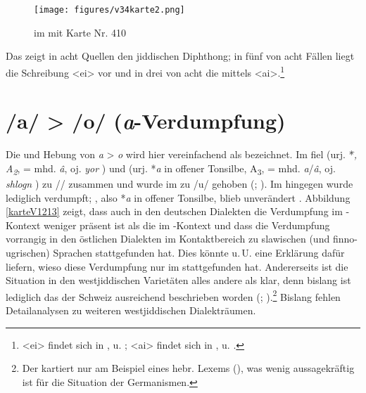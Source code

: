  
 \begin{figure}[h!]
		\centering
\texttt{[image: figures/v34karte2.png]}
		\caption{\label{karteV34}   im  mit  Karte Nr. 410}
		\end{figure}
\FloatBarrier
 

 
 
 Das  zeigt in acht Quellen den jiddischen Diphthong; in fünf von acht Fällen liegt die Schreibung <ei> vor und in drei von acht die mittels <ai>.\footnote{<ei> findet sich in ,  u. ; <ai> findet sich in ,  u. .}\\ 
 
 
 
  \section{/a/ > /o/ (\textit{a}-Verdumpfung)}\label{phonV1213}

Die  und Hebung von \textit{a} > \textit{o} wird hier vereinfachend als  bezeichnet. Im  fiel  (urj. *\textit{\=\textopeno\textlengthmark, A\textsubscript{2}}, = mhd. \textit{â}, oj.  \textit{yor} ) und  (urj. *\textit{a} in offener Tonsilbe,  A\textsubscript{3}, = mhd. \textit{a}/\textit{â}, oj.  \textit{shlogn} ) zu /\textopeno\textlengthmark/ zusammen und wurde im  zu /u\textlengthmark/ gehoben (\cite[93–121]{Timm1987}; \cite[186f]{Bin-Nun1973}). Im  hingegen wurde lediglich  verdumpft; , also *\textit{a} in offener Tonsilbe, blieb unverändert \parencite{Beider2010}. Abbildung \ref{karteV1213} zeigt, dass auch in den deutschen Dialekten die Verdumpfung im -Kontext weniger präsent ist als die im -Kontext und dass die Verdumpfung vorrangig in den östlichen Dialekten im Kontaktbereich zu slawischen (und finno-ugrischen) Sprachen stattgefunden hat. Dies könnte u.\,U. eine Erklärung dafür liefern, wieso diese Verdumpfung nur im  stattgefunden hat. Andererseits ist die Situation in den westjiddischen Varietäten alles andere als klar, denn bislang ist lediglich das  der Schweiz ausreichend beschrieben worden (\cite{GuggenheimGruenberg1973}; \cite{Beider2010}).\footnote{Der  kartiert  nur am Beispiel eines hebr. Lexems (\cite[68]{Herzog1992}), was wenig aussagekräftig ist für die Situation der Germanismen.} Bislang fehlen Detailanalysen zu weiteren westjiddischen Dialekträumen.

